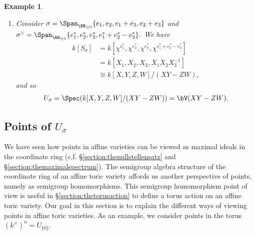 \documentclass[12pt]{amsart}
\theoremstyle{plain}
\newtheorem{example}[theorem]{Example}
\begin{document}
\begin{example}
\begin{enumerate}
\begin{figure}[H]
\end{figure}
\noindent
While $\{2 e_1^* + e_2^*, e_2^*\}$ generates $\sigma^\vee$ as a cone, it does not generate $S_\sigma$ as a semigroup, since not every element in $S_\sigma$ lies in $\Span_{\ZZ_{\ge 0}} \{2 e_1^* + e_2^*,  e_2^*\}$.
For example, $e_1^* + e_2^* \in S_\sigma$, but $e_1^* + e_2^* \notin \Span_{\ZZ_{\ge 0}} \{2 e_1^* + e_2^*,  e_2^*\}.$
However, $\{2 e_1^* + e_2^*,  e_2^*, e_1^* + e_2^*\}$ does generate $S_\sigma$.
Then,
\begin{align*}
	\qquad k[S_\sigma] = k[\chi^{e_2^*}, \chi^{2 e_1^* + e_2^*}, \chi^{e_1^* + e_2^*}] &= k[X_2, X_1^2 X_2, X_1 X_2] \cong k[X, Y, Z] / (X Y - Z^2),
\end{align*}
and
$$U_\sigma = \Spec(k[X, Y, Z] / (XY - Z^2) )= \bV(X Y - Z^2).$$

\item
Consider $\sigma = \Span_{\RR_{\ge 0}}\{ e_1, e_2, e_1+e_3, e_2 + e_3\}$ and $\sigma^\vee = \Span_{\RR_{\ge 0}} \{e_1^*, e_2^*, e_3^*, e_1^* +e_2^* - e_3^*\}.$
We have 
\begin{align*}
	k[S_\sigma] &= k[\chi^{e_1^*}, \chi^{e_2^*}, \chi^{e_3^*}, \chi^{e_1^* +e_2^* - e_3^*}] \\
	&= k[X_1, X_2, X_3, X_1 X_2 X_3^{-1}] \\
	&\cong k[X, Y, Z, W]/(XY - ZW),
\end{align*}
and so
$$U_\sigma = \Spec(k[X, Y, Z, W] / (XY - ZW) ) = \bV(XY-ZW).$$
\end{enumerate}
\end{example}





\subsection{Points of $U_\sigma$}\label{section:points}
We have seen how points in affine varieties can be viewed as maximal ideals in the coordinate ring (c.f. \S \ref{section:thenullstellensatz} and \S \ref{section:themaximalspectrum}).
The semigroup algebra structure of the coordinate ring of an affine toric variety affords us another perspective of points, namely as semigroup homomorphisms.
This semigroup homomorphism point of view is useful in \S\ref{section:thetorusaction} to define a torus action on an affine toric variety.
Our goal in this section is to explain the different ways of viewing points in affine toric varieties.
As an example, we consider points in the torus $(k^\times)^n = U_{\{0\}}$.
\end{document}
